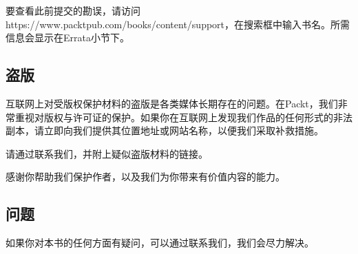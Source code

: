 
要查看此前提交的勘误，请访问https://\allowbreak{}www.\allowbreak{}packtpub.\allowbreak{}com/\allowbreak{}books/\allowbreak{}content/\allowbreak{}support，在搜索框中输入书名。所需信息会显示在Errata小节下。



\subsection*{盗版}



互联网上对受版权保护材料的盗版是各类媒体长期存在的问题。在Packt，我们非常重视对版权与许可证的保护。如果你在互联网上发现我们作品的任何形式的非法副本，请立即向我们提供其位置地址或网站名称，以便我们采取补救措施。



请通过联系我们，并附上疑似盗版材料的链接。



感谢你帮助我们保护作者，以及我们为你带来有价值内容的能力。



\subsection*{问题}



如果你对本书的任何方面有疑问，可以通过联系我们，我们会尽力解决。
